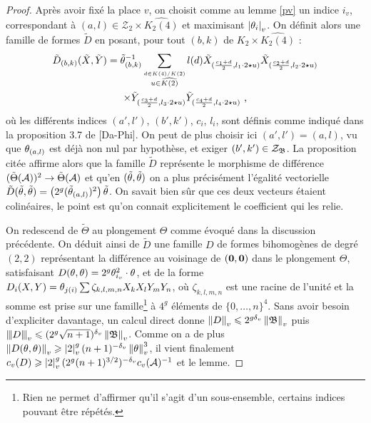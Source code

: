 \begin{proof}
  Après avoir fixé la place $v$, on choisit comme au lemme \ref{pv} un indice
  $i_v$, correspondant à $(a, l) \in \mathcal{Z}_2 \times \widehat{K_2(4)}$ et
  maximisant $\left\lvert\theta_i\right\rvert_{v}$. On définit alors une famille de formes $\tilde{D}$
  en posant, pour tout $(b, k)$ de $K_2 \times \widehat{K_2(4)}$ :
  \begin{multline*}
  \tilde{D}_{(b, k)}(\tilde{X}, \tilde{Y}) = \tilde{\theta}_{(b, k)}^{-1}
  \sum_{\stackrel{d \in K(4)/K(2)}{u \in \widehat{K(2)}}} l(d)
  \tilde{X}_{(\frac{c_1+d}{2}, l_1\cdot2\star u)}
  \tilde{X}_{(\frac{c_2+d}{2}, l_2\cdot2\star u)} \\\times
  \tilde{Y}_{(\frac{c_3+d}{2}, l_3\cdot2\star u)}
  \tilde{Y}_{(\frac{c_4+d}{2}, l_4\cdot2\star u)} \text{ ,}
  \end{multline*}
  où les différents indices $(a', l')$, $(b', k')$, $c_i$, $l_i$, sont définis
  comme indiqué dans la proposition 3.7 de [Da-Phi]. On peut de plus choisir
  ici $(a', l')= (a, l)$, vu que $\theta_{(a, l)}$ est déjà non nul par
  hypothèse, et exiger $(b', k') \in \mathcal{Z}_{\mathfrak{B}}$. La proposition citée
  affirme alors que la famille $\tilde{D}$ représente le morphisme de
  différence $(\tilde\Theta(\mathcal{A}))^2 \to \tilde\Theta(\mathcal{A})$ et qu'en
  $(\tilde{\theta}, \tilde{\theta})$ on a plus précisément l'égalité vectorielle
  $\tilde{D}(\tilde{\theta}, \tilde{\theta}) = \left( 2^g (\tilde{\theta}_{(a,
  l)})^2\right) \tilde{\theta}$. On savait bien sûr que ces deux vecteurs
  étaient colinéaires, le point est qu'on connait explicitement le coefficient
  qui les relie.

  On redescend de $\tilde\Theta$ au plongement $\Theta$ comme évoqué dans la
  discussion précédente. On déduit ainsi de $\tilde D$ une famille $D$ de
  formes bihomogènes de degré $(2, 2)$ représentant la différence au voisinage
  de $({\boldsymbol{0}}, {\boldsymbol{0}})$ dans le plongement $\Theta$, satisfaisant $D(\theta, \theta) =
  2^g \theta_{i_v}^2 \cdot \theta$, et de la forme $D_i(X, Y)= \theta_{j(i)} \sum
  \zeta_{k,l,m,n} X_kX_lY_mY_n$, où $\zeta_{k,l,m,n}$ est une racine de
  l'unité et la somme est prise sur une famille\footnote{Rien ne permet  d'affirmer qu'il s'agit d'un sous-ensemble, certains indices
  pouvant être répétés.} à $4^g$ éléments de $\{0, \dots, n\}^4$. Sans avoir
  besoin d'expliciter davantage, un calcul direct donne $\left\lVert D\right\rVert_{v} \leqslant 2^{g{\delta_v}}
  \left\lVert\mathfrak{B}\right\rVert_{v}$ puis $\left\lvert\hspace{-1pt} \left\lvert\hspace{-1pt} \left\lvert D\right\rvert \hspace{-1pt}\right\rvert \hspace{-1pt}\right\rvert_{v} \leqslant (2^g\sqrt{n+1})^{\delta_v} \left\lVert\mathfrak{B}\right\rVert_{v}$. Comme on a de plus
  $\left\lVert D(\theta, \theta)\right\rVert_{v} \geqslant \left\lvert2\right\rvert_{v}^g(n+1)^{-{\delta_v}}\left\lVert\theta\right\rVert_{v}^3$, il vient finalement
  $c_v(D) \geqslant \left\lvert2\right\rvert_{v}^g (2^g(n+1)^{3/2})^{-{\delta_v}} c_v(\mathcal{A})^{-1}$ et le lemme.
\end{proof}

